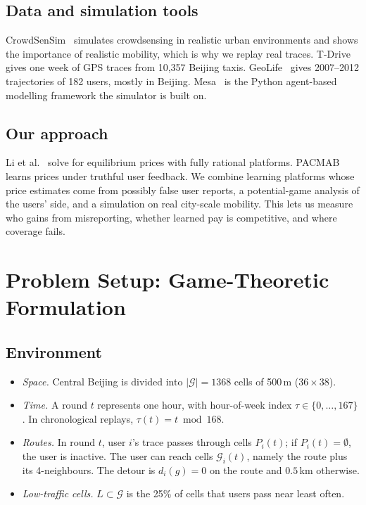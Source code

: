 \documentclass[12pt,draftcls,onecolumn]{IEEEtran}
\begin{document}
\subsection{Data and simulation tools}
CrowdSenSim~\cite{fiandrino2017crowdsensim} simulates crowdsensing in realistic urban environments and shows the importance of realistic mobility, which is why we replay real traces. T-Drive~\cite{yuan2010tdrive} gives one week of GPS traces from 10,357 Beijing taxis. GeoLife~\cite{zheng2010geolife} gives 2007--2012 trajectories of 182 users, mostly in Beijing. Mesa~\cite{kazil2020mesa} is the Python agent-based modelling framework the simulator is built on.

\subsection{Our approach}
Li et al.~\cite{li2021mp} solve for equilibrium prices with fully rational platforms. PACMAB~\cite{dongare2026pacmab} learns prices under truthful user feedback. We combine learning platforms whose price estimates come from possibly false user reports, a potential-game analysis of the users' side, and a simulation on real city-scale mobility. This lets us measure who gains from misreporting, whether learned pay is competitive, and where coverage fails.

\section{Problem Setup: Game-Theoretic Formulation}\label{sec:model}
\subsection{Environment}
\begin{itemize}
\item \emph{Space.} Central Beijing is divided into $|\mathcal G|=1368$ cells of 500\,m ($36\times38$).
\item \emph{Time.} A round $t$ represents one hour, with hour-of-week index $\tau\in\{0,\dots,167\}$. In chronological replays, $\tau(t)=t\bmod168$.
\item \emph{Routes.} In round $t$, user $i$'s trace passes through cells $P_i(t)$; if $P_i(t)=\emptyset$, the user is inactive. The user can reach cells $\mathcal G_i(t)$, namely the route plus its 4-neighbours. The detour is $d_i(g)=0$ on the route and $0.5$\,km otherwise.
\item \emph{Low-traffic cells.} $L\subset\mathcal G$ is the 25\% of cells that users pass near least often.
\end{itemize}
\end{document}
